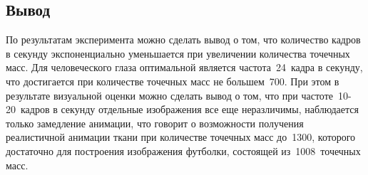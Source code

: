 
\subsection*{Вывод}

По результатам эксперимента можно сделать вывод о том, что количество кадров в
секунду экспоненциально уменьшается при увеличении количества точечных масс. Для
человеческого глаза оптимальной является частота~24~кадра в секунду, что
достигается при количестве точечных масс не большем~700. При этом в результате
визуальной оценки можно сделать вывод о том, что при частоте~10-20~кадров в
секунду отдельные изображения все еще неразличимы, наблюдается только замедление
анимации, что говорит о возможности получения реалистичной анимации ткани при
количестве точечных масс до~1300, которого достаточно для построения изображения
футболки, состоящей из~1008~точечных масс.
